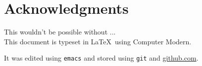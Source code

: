 \chapter*{Acknowledgments}

This wouldn't be possible without ...
\\[2ex]

This document is typeset in \LaTeX\ using Computer Modern. \medskip

It was edited using \texttt{emacs} and stored using \texttt{git} and
\url{github.com}. \medskip


